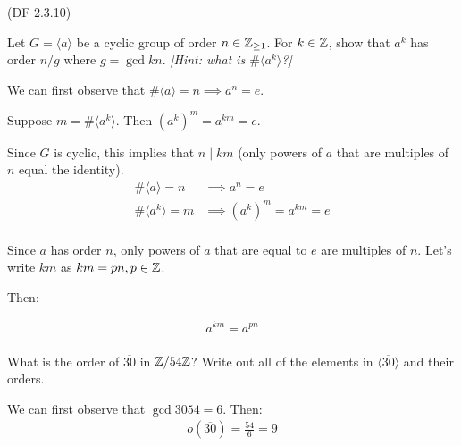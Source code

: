 \begin{problem} \textsf{(DF 2.3.10)}
  
  \noindent
  \begin{enumalph}
    \item Let $G=\langle a \rangle$ be a cyclic group of order $n \in \mathbb{Z}_{\geq 1}$.  
      For $k \in \mathbb{Z}$, show that $a^k$ has order $n/g$ where $g=\gcd{k}{n}$.  \emph{[Hint: 
      what is $\#\langle a^k \rangle$?]}
      \begin{Answer}

        \noindent
        We can first observe that $\#\langle a \rangle = n \implies a^n = e$.

        \noindent
        Suppose $m = \#\langle a^k \rangle$. Then ${(a^k)}^m = a^{km} = e$.
        
        \noindent
        Since $G$ is cyclic, this implies that $n \mid km$ (only powers of $a$
        that are multiples of $n$ equal the identity).
        \begin{align*}
          \#\langle a \rangle = n &\implies a^n = e \\
          \#\langle a^k \rangle = m &\implies {(a^k)}^m = a^{km} = e \\
        \end{align*}

        \noindent
        Since $a$ has order $n$, only powers
        of $a$ that are equal to $e$ are multiples of $n$. Let's write
        $km$ as $km = pn, p \in \mathbb{Z}$. 
        
        \noindent
        Then:
        
        \begin{align*}
          a^{km} = a^{pn} \\
        \end{align*}
      \end{Answer}

    \item What is the order of $\overline{30}$ in $\mathbb{Z}/54\mathbb{Z}$?  Write out all of the 
      elements in $\langle \overline{30} \rangle$ and their orders.
      \begin{Answer}
        \noindent
        We can first observe that $\gcd{30}{54} = 6$. Then:
        \begin{align*}
          o(\overline{30}) = \frac{54}{6} = 9 \\
        \end{align*}


\end{Answer}
\end{enumalph}
\end{problem}
